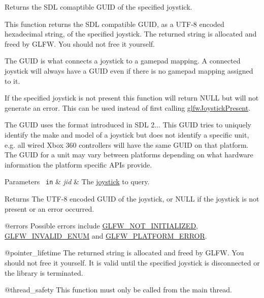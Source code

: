 Returns the S\+DL comaptible G\+U\+ID of the specified joystick. 

This function returns the S\+DL compatible G\+U\+ID, as a U\+T\+F-\/8 encoded hexadecimal string, of the specified joystick. The returned string is allocated and freed by G\+L\+FW. You should not free it yourself.

The G\+U\+ID is what connects a joystick to a gamepad mapping. A connected joystick will always have a G\+U\+ID even if there is no gamepad mapping assigned to it.

If the specified joystick is not present this function will return {\ttfamily N\+U\+LL} but will not generate an error. This can be used instead of first calling \mbox{\hyperlink{group__input_gacb1b7dfd79df673d48814c06fc436eff}{glfw\+Joystick\+Present}}.

The G\+U\+ID uses the format introduced in S\+DL 2... This G\+U\+ID tries to uniquely identify the make and model of a joystick but does not identify a specific unit, e.\+g. all wired Xbox 360 controllers will have the same G\+U\+ID on that platform. The G\+U\+ID for a unit may vary between platforms depending on what hardware information the platform specific A\+P\+Is provide.


\begin{DoxyParams}[1]{Parameters}
\mbox{\texttt{ in}}  & {\em jid} & The \mbox{\hyperlink{group__joysticks}{joystick}} to query. \\
\hline
\end{DoxyParams}
\begin{DoxyReturn}{Returns}
The U\+T\+F-\/8 encoded G\+U\+ID of the joystick, or {\ttfamily N\+U\+LL} if the joystick is not present or an error occurred.
\end{DoxyReturn}
@errors Possible errors include \mbox{\hyperlink{group__errors_ga2374ee02c177f12e1fa76ff3ed15e14a}{G\+L\+F\+W\+\_\+\+N\+O\+T\+\_\+\+I\+N\+I\+T\+I\+A\+L\+I\+Z\+ED}}, \mbox{\hyperlink{group__errors_ga76f6bb9c4eea73db675f096b404593ce}{G\+L\+F\+W\+\_\+\+I\+N\+V\+A\+L\+I\+D\+\_\+\+E\+N\+UM}} and \mbox{\hyperlink{group__errors_gad44162d78100ea5e87cdd38426b8c7a1}{G\+L\+F\+W\+\_\+\+P\+L\+A\+T\+F\+O\+R\+M\+\_\+\+E\+R\+R\+OR}}.

@pointer\+\_\+lifetime The returned string is allocated and freed by G\+L\+FW. You should not free it yourself. It is valid until the specified joystick is disconnected or the library is terminated.

@thread\+\_\+safety This function must only be called from the main thread.

